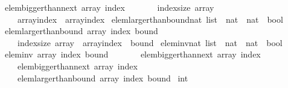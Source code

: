 \begin{isabellebody}
\ \ \ {\isachardoublequoteopen}elem{\isacharunderscore}bigger{\isacharunderscore}than{\isacharunderscore}next\ array\ index\ {\isasymequiv}\isanewline
\ \ \ \ \ \ {\isacharparenleft}index{\isacharplus}{}{\isacharless}{\isacharparenleft}size\ array{\isacharparenright}{\isacharparenright}\ {\isasymlongrightarrow}\isanewline
\ \ \ \ \ \ {\isacharparenleft}array{\isacharbang}index{\isacharparenright}\ {\isachargreater}\ {\isacharparenleft}array{\isacharbang}{\isacharparenleft}index{\isacharplus}{}{\isacharparenright}{\isacharparenright}{\isachardoublequoteclose}\isanewline
\isanewline
{}\isamarkupfalse%
\ elem{\isacharunderscore}larger{\isacharunderscore}than{\isacharunderscore}bound{\isacharcolon}{\isacharcolon}{\isachardoublequoteopen}nat\ list\ {\isasymRightarrow}\ nat\ {\isasymRightarrow}\ nat\ {\isasymRightarrow}\ bool{\isachardoublequoteclose}\isanewline
\ \ \ {\isachardoublequoteopen}elem{\isacharunderscore}larger{\isacharunderscore}than{\isacharunderscore}bound\ array\ index\ bound\ {\isasymequiv}\isanewline
\ \ \ \ \ \ {\isacharparenleft}index{\isacharless}{\isacharparenleft}size\ array{\isacharparenright}{\isacharparenright}\ {\isasymlongrightarrow}\ {\isacharparenleft}array{\isacharbang}index{\isacharparenright}\ {\isasymge}\ bound{\isachardoublequoteclose}\isanewline
\isanewline
{}\isamarkupfalse%
\ elem{\isacharunderscore}inv{\isacharcolon}{\isacharcolon}{\isachardoublequoteopen}nat\ list\ {\isasymRightarrow}\ nat\ {\isasymRightarrow}\ nat\ {\isasymRightarrow}\ bool{\isachardoublequoteclose}\isanewline
\ \ \ {\isachardoublequoteopen}elem{\isacharunderscore}inv\ array\ index\ bound\ {\isasymequiv}\isanewline
\ \ \ \ \ \ {\isacharparenleft}elem{\isacharunderscore}bigger{\isacharunderscore}than{\isacharunderscore}next{\isacharunderscore}{}\ array\ index{\isacharparenright}\ {\isasymand}\isanewline
\ \ \ \ \ \ {\isacharparenleft}elem{\isacharunderscore}bigger{\isacharunderscore}than{\isacharunderscore}next\ array\ index{\isacharparenright}\ {\isasymand}\isanewline
\ \ \ \ \ \ {\isacharparenleft}elem{\isacharunderscore}larger{\isacharunderscore}than{\isacharunderscore}bound\ array\ index\ bound{\isacharparenright}{\isachardoublequoteclose}\isanewline
\isanewline
\isanewline
{}\isamarkupfalse%
\ {\isachardoublequoteopen}{\isacharparenleft}{}{\isacharcolon}{\isacharcolon}int{\isacharparenright}{\isacharhash}{}{\isacharhash}{}{\isacharhash}{\isacharbrackleft}{\isacharbrackright}{\isachardoublequoteclose}\isanewline

\end{isabellebody}
